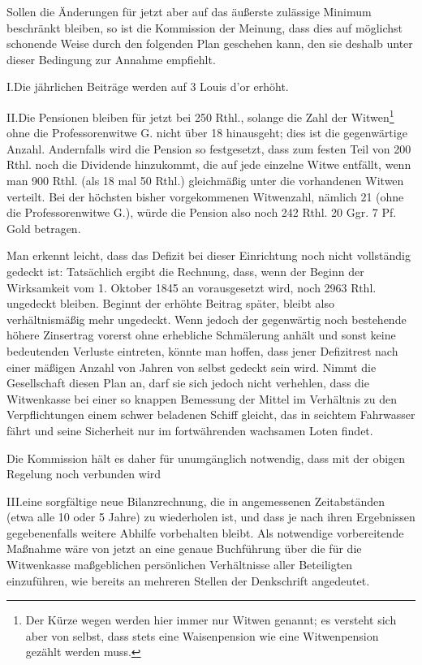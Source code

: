 \par{}
Sollen die Änderungen für jetzt aber auf das äußerste zulässige Minimum beschränkt bleiben, so ist die Kommission der Meinung, dass dies auf möglichst schonende Weise durch den folgenden Plan geschehen kann, den sie deshalb unter dieser Bedingung zur Annahme empfiehlt.

I.\quad Die jährlichen Beiträge werden auf 3 Louis d'or erhöht.

II.\quad Die Pensionen bleiben für jetzt bei 250 Rthl., solange die Zahl der Witwen\footnote{Der Kürze wegen werden hier immer nur Witwen genannt; es versteht sich aber von selbst, dass stets eine Waisenpension wie eine Witwenpension gezählt werden muss.} ohne die Professorenwitwe G. nicht über 18 hinausgeht; dies ist die gegenwärtige Anzahl. Andernfalls wird die Pension so festgesetzt, dass zum festen Teil von 200 Rthl. noch die Dividende hinzukommt, die auf jede einzelne Witwe entfällt, wenn man 900 Rthl. (als 18 mal 50 Rthl.) gleichmäßig unter die vorhandenen Witwen verteilt. Bei der höchsten bisher vorgekommenen Witwenzahl, nämlich 21 (ohne die Professorenwitwe G.), würde die Pension also noch 242 Rthl. 20 Ggr. 7 Pf. Gold betragen.

Man erkennt leicht, dass das Defizit bei dieser Einrichtung noch nicht vollständig gedeckt ist: Tatsächlich ergibt die Rechnung, dass, wenn der Beginn der Wirksamkeit vom 1. Oktober 1845 an vorausgesetzt wird, noch 2963 Rthl. ungedeckt bleiben. Beginnt der erhöhte Beitrag später, bleibt also verhältnismäßig mehr ungedeckt. Wenn jedoch der gegenwärtig noch bestehende höhere Zinsertrag vorerst ohne erhebliche Schmälerung anhält und sonst keine bedeutenden Verluste eintreten, könnte man hoffen, dass jener Defizitrest nach einer mäßigen Anzahl von Jahren von selbst gedeckt sein wird. Nimmt die Gesellschaft diesen Plan an, darf sie sich jedoch nicht verhehlen, dass die Witwenkasse bei einer so knappen Bemessung der Mittel im Verhältnis zu den Verpflichtungen einem schwer beladenen Schiff gleicht, das in seichtem Fahrwasser fährt und seine Sicherheit nur im fortwährenden wachsamen Loten findet.

Die Kommission hält es daher für unumgänglich notwendig, dass mit der obigen Regelung noch verbunden wird

III.\quad eine sorgfältige neue Bilanzrechnung, die in angemessenen Zeitabständen (etwa alle 10 oder 5 Jahre) zu wiederholen ist, und dass je nach ihren Ergebnissen gegebenenfalls weitere Abhilfe vorbehalten bleibt. Als notwendige vorbereitende Maßnahme wäre von jetzt an eine genaue Buchführung über die für die Witwenkasse maßgeblichen persönlichen Verhältnisse aller Beteiligten einzuführen, wie bereits an mehreren Stellen der Denkschrift angedeutet.

